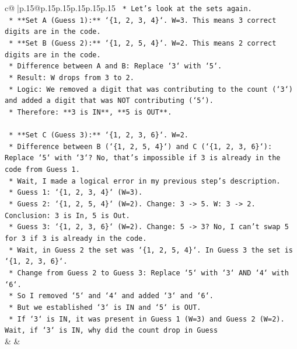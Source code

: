 \documentclass{article}
\begin{document}
{\begin{supertabular}{c@{$\;$}|p{.15\linewidth}@{}p{.15\linewidth}p{.15\linewidth}p{.15\linewidth}p{.15\linewidth}p{.15\linewidth}}
{{{\texttt{        *   Let's look at the sets again.} \\
\texttt{        *   **Set A (Guess 1):** `\{1, 2, 3, 4\}`. W=3. This means 3 correct digits are in the code.} \\
\texttt{        *   **Set B (Guess 2):** `\{1, 2, 5, 4\}`. W=2. This means 2 correct digits are in the code.} \\
\texttt{        *   Difference between A and B: Replace `3` with `5`.} \\
\texttt{        *   Result: W drops from 3 to 2.} \\
\texttt{        *   Logic: We removed a digit that was contributing to the count (`3`) and added a digit that was NOT contributing (`5`).} \\
\texttt{        *   Therefore: **3 is IN**, **5 is OUT**.} \\
\\ 
\texttt{    *   **Set C (Guess 3):** `\{1, 2, 3, 6\}`. W=2.} \\
\texttt{    *   Difference between B (`\{1, 2, 5, 4\}`) and C (`\{1, 2, 3, 6\}`): Replace `5` with `3`? No, that's impossible if 3 is already in the code from Guess 1.} \\
\texttt{    *   Wait, I made a logical error in my previous step's description.} \\
\texttt{        *   Guess 1: `\{1, 2, 3, 4\}` (W=3).} \\
\texttt{        *   Guess 2: `\{1, 2, 5, 4\}` (W=2). Change: 3 {-}> 5. W: 3 {-}> 2. Conclusion: 3 is In, 5 is Out.} \\
\texttt{        *   Guess 3: `\{1, 2, 3, 6\}` (W=2). Change: 5 {-}> 3? No, I can't swap 5 for 3 if 3 is already in the code.} \\
\texttt{        *   Wait, in Guess 2 the set was `\{1, 2, 5, 4\}`. In Guess 3 the set is `\{1, 2, 3, 6\}`.} \\
\texttt{        *   Change from Guess 2 to Guess 3: Replace `5` with `3` AND `4` with `6`.} \\
\texttt{        *   So I removed `5` and `4` and added `3` and `6`.} \\
\texttt{        *   But we established `3` is IN and `5` is OUT.} \\
\texttt{        *   If `3` is IN, it was present in Guess 1 (W=3) and Guess 2 (W=2). Wait, if `3` is IN, why did the count drop in Guess} \\
            }
        }
    }
    & & \\ \\


\end{supertabular}}
\end{document}
